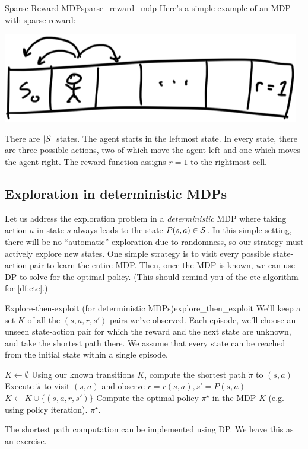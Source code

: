 \documentclass[\main/main]{subfiles}
\begin{document}
\begin{example}{Sparse Reward MDP}{sparse_reward_mdp}
    Here's a simple example of an MDP with sparse reward:

    \begin{center}
        \includegraphics{assets/sparse_reward_mdp}
    \end{center}

    There are $|\S|$ states.
    The agent starts in the leftmost state.
    In every state, there are three possible actions, two of which move the agent left and one which moves the agent right. The reward function assigns $r=1$ to the rightmost cell.
\end{example}


\subsection{Exploration in deterministic MDPs}

Let us address the exploration problem in a \emph{deterministic} MDP where taking action $a$ in state $s$ always leads to the state $P(s, a) \in \S$.
In this simple setting, there will be no ``automatic'' exploration due to randomness, so our strategy must actively explore new states.
One simple strategy is to visit every possible state-action pair to learn the entire MDP.
Then, once the MDP is known, we can use DP to solve for the optimal policy.
(This should remind you of the \acrlong{etc} algorithm for  \eqref{df:etc}.)

\begin{definition}{Explore-then-exploit (for deterministic MDPs)}{explore_then_exploit}
    We'll keep a set $K$ of all the $(s, a, r, s')$ pairs we've observed.
    Each episode, we'll choose an unseen state-action pair for which the reward and the next state are unknown, and take the shortest path there.
    We assume that every state can be reached from the initial state within a single episode.

    \begin{algorithmic}
        \State $K \gets \emptyset$
        \State Using our known transitions $K$, compute the shortest path $\tilde \pi$ to $(s, a)$
        \State Execute $\tilde \pi$ to visit $(s, a)$ and observe $r = r(s, a), s' = P(s, a)$
        \State $K \gets K \cup \{ (s, a, r, s') \}$
        \EndWhile
        \State Compute the optimal policy $\pi^\star$ in the MDP $K$ (e.g. using policy iteration).
        \State \Return $\pi^\star$.
    \end{algorithmic}

    The shortest path computation can be implemented using DP. We leave this as an exercise.
\end{definition}
\end{document}
